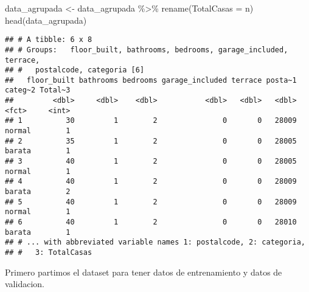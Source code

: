 \documentclass[
]{article}
\newenvironment{Shaded}{\begin{snugshade}}{\end{snugshade}}
\newcommand{\AttributeTok}[1]{\textcolor[rgb]{0.77,0.63,0.00}{#1}}
\newcommand{\ConstantTok}[1]{\textcolor[rgb]{0.00,0.00,0.00}{#1}}
\newcommand{\FloatTok}[1]{\textcolor[rgb]{0.00,0.00,0.81}{#1}}
\newcommand{\FunctionTok}[1]{\textcolor[rgb]{0.00,0.00,0.00}{#1}}
\newcommand{\NormalTok}[1]{#1}
\newcommand{\OtherTok}[1]{\textcolor[rgb]{0.56,0.35,0.01}{#1}}
\newcommand{\SpecialCharTok}[1]{\textcolor[rgb]{0.00,0.00,0.00}{#1}}
\begin{document}
\begin{Shaded}
\begin{Highlighting}[]
\NormalTok{data\_agrupada }\OtherTok{\textless{}{-}}\NormalTok{ data\_agrupada  }\SpecialCharTok{\%\textgreater{}\%}
\FunctionTok{rename}\NormalTok{(}\AttributeTok{TotalCasas =}\NormalTok{ n)}
\FunctionTok{head}\NormalTok{(data\_agrupada)}
\end{Highlighting}
\end{Shaded}

\begin{verbatim}
## # A tibble: 6 x 8
## # Groups:   floor_built, bathrooms, bedrooms, garage_included, terrace,
## #   postalcode, categoria [6]
##   floor_built bathrooms bedrooms garage_included terrace posta~1 categ~2 Total~3
##         <dbl>     <dbl>    <dbl>           <dbl>   <dbl>   <dbl> <fct>     <int>
## 1          30         1        2               0       0   28009 normal        1
## 2          35         1        2               0       0   28005 barata        1
## 3          40         1        2               0       0   28005 normal        1
## 4          40         1        2               0       0   28009 barata        2
## 5          40         1        2               0       0   28009 normal        1
## 6          40         1        2               0       0   28010 barata        1
## # ... with abbreviated variable names 1: postalcode, 2: categoria,
## #   3: TotalCasas
\end{verbatim}

Primero partimos el dataset para tener datos de entrenamiento y datos de
validacion.

\begin{Shaded}
\end{Shaded}
\end{document}
